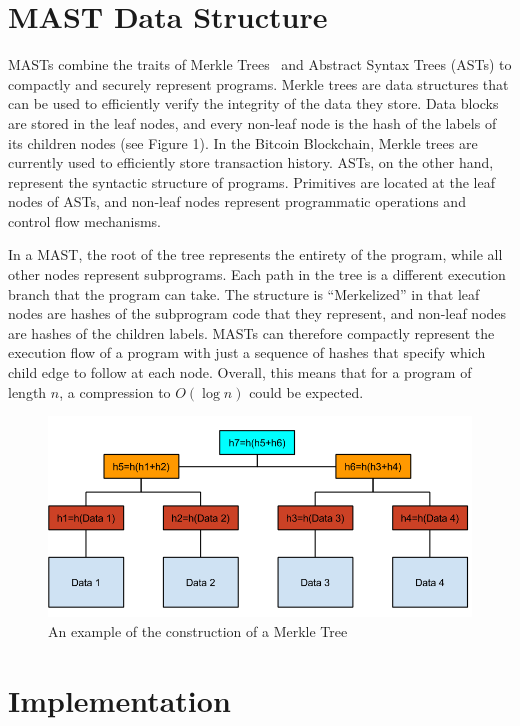 \documentclass{vldb}
\begin{document}
\section{MAST Data Structure}

MASTs combine the traits of Merkle Trees~\cite{merkle} and Abstract Syntax
Trees (ASTs) to compactly and securely represent programs. Merkle trees are
data structures that can be used to efficiently verify the integrity of the
data they store.  Data blocks are stored in the leaf nodes, and every non-leaf
node is the hash of the labels of its children nodes (see Figure 1). In the
Bitcoin Blockchain, Merkle trees are currently used to efficiently store
transaction history. ASTs, on the other hand, represent the syntactic structure
of programs. Primitives are located at the leaf nodes of ASTs, and non-leaf
nodes represent programmatic operations and control flow mechanisms.
 
In a MAST, the root of the tree represents the entirety of the program, while
all other nodes represent subprograms. Each path in the tree is a different
execution branch that the program can take. The structure is ``Merkelized'' in
that leaf nodes are hashes of the subprogram code that they represent, and
non-leaf nodes are hashes of the children labels. MASTs can therefore compactly
represent the execution flow of a program with just a sequence of hashes that
specify which child edge to follow at each node. Overall, this means that for
a program of length $n$, a compression to $O(\log{}n)$ could be expected.

\vfill

\begin{figure}[h]
	\includegraphics[scale=.4]{merkle_tree}
	\caption{An example of the construction of a Merkle Tree}
	\label{merkle}
\end{figure}

\section{Implementation}
\end{document}
